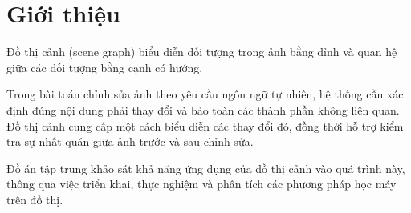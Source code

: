 
\section{Giới thiệu}

Đồ thị cảnh (scene graph) biểu diễn đối tượng trong ảnh bằng đỉnh và quan hệ giữa các đối tượng bằng cạnh có hướng.

Trong bài toán chỉnh sửa ảnh theo yêu cầu ngôn ngữ tự nhiên, hệ thống cần xác định đúng nội dung phải thay đổi và bảo toàn các thành phần không liên quan. Đồ thị cảnh cung cấp một cách biểu diễn các thay đổi đó, đồng thời hỗ trợ kiểm tra sự nhất quán giữa ảnh trước và sau chỉnh sửa.

Đồ án tập trung khảo sát khả năng ứng dụng của đồ thị cảnh vào quá trình này, thông qua việc triển khai, thực nghiệm và phân tích các phương pháp học máy trên đồ thị.
